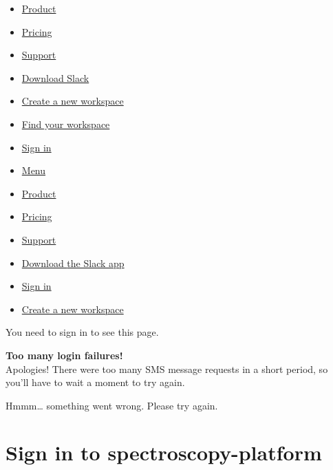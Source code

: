 \href{https://slack.com/}{}

\begin{itemize}
\tightlist
\item
  \href{https://slack.com/is}{Product}
\item
  \href{https://slack.com/pricing?ui_step=55\&ui_element=5}{Pricing}
\item
  \href{https://get.slack.help/hc/en-us}{Support}
\item
  \href{/get}{Download Slack}
\item
  \href{https://slack.com/create}{Create a new workspace}
\item
  \href{https://slack.com/get-started}{Find your workspace}
\item
  \href{https://slack.com/signin}{Sign in}
\item
  \protect\hyperlink{}{Menu}
\end{itemize}

\href{https://slack.com/}{} \protect\hyperlink{}{}

\begin{itemize}
\tightlist
\item
  \href{https://slack.com/is}{Product}
\item
  \href{https://slack.com/pricing?ui_step=55\&ui_element=5}{Pricing}
\item
  \href{https://get.slack.help/hc/en-us}{Support}
\item
  \href{/get}{Download {the Slack app}}
\end{itemize}

\begin{itemize}
\tightlist
\item
  \href{https://slack.com/signin}{{Sign in}}
\item
  \href{https://slack.com/create}{{Create a new workspace}}
\end{itemize}

\hypertarget{page}{}
\hypertarget{pageux5fcontents}{}
\emph{} You need to sign in to see this page.

\emph{} \textbf{Too many login failures!}\\
Apologies! There were too many SMS message requests in a short period,
so you'll have to wait a moment to try again.

\emph{} Hmmm\ldots{} something went wrong. Please try again.

\section{\texorpdfstring{Sign in to
{spectroscopy-platform}}{Sign in to spectroscopy-platform}}\label{signinux5fheader}

